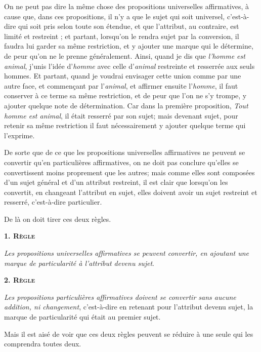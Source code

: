 On ne peut pas dire la même chose des propositions universelles affirmatives, à cause que, dans ces propositions, il n'y a que le sujet qui soit universel, c'est-à-dire qui soit pris selon toute son étendue, et que l'attribut, au contraire, est limité et restreint ; et partant, lorsqu'on le rendra sujet par la conversion, il faudra lui garder sa même restriction, et y ajouter une marque qui le détermine, de peur qu'on ne le prenne généralement. Ainsi, quand je dis que \emph{l'homme est animal}, j'unis l'idée d'\emph{homme} avec celle d'\emph{animal} restreinte et resserrée aux seuls hommes. Et partant, quand je voudrai envisager cette union comme par une autre face, et commençant par l'\emph{animal}, et affirmer ensuite l'\emph{homme}, il faut conserver à ce terme sa même restriction, et de peur que l'on ne s'y trompe, y ajouter quelque note de détermination. Car dans la première proposition, \emph{Tout homme est animal}, il était resserré par son sujet; mais devenant sujet, pour retenir sa même restriction il faut nécessairement y ajouter quelque terme qui l'exprime.

De sorte que de ce que les propositions universelles affirmatives ne peuvent se convertir qu'en particulières affirmatives, on ne doit pas conclure qu'elles se convertissent moins proprement que les autres; mais comme elles sont composées d'un sujet général et d'un attribut restreint, il est clair que lorsqu'on les convertit, en changeant l'attribut en sujet, elles doivent avoir un sujet restreint et resserré, c'est-à-dire particulier.

De là on doit tirer ces deux règles.

\begin{center}{\bfseries\scshape\large 1. Règle}\end{center}

	\emph{Les propositions universelles affirmatives se peuvent convertir, en ajoutant une marque de particularité à l'attribut devenu sujet}.




\begin{center}{\bfseries\scshape\large 2. Règle}\end{center}

	\emph{Les propositions particulières affirmatives doivent se convertir sans aucune addition, ni changement}, c'est-à-dire en retenant pour l'attribut devenu sujet, la marque de particularité qui était au premier sujet.

Mais il est aisé de voir que ces deux règles peuvent se réduire à une seule qui les comprendra toutes deux.

